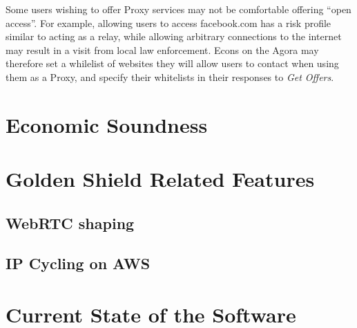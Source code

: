 \documentclass{article}
\begin{document}
Some users wishing to offer Proxy services may not be comfortable offering ``open access''. For example, allowing users to access facebook.com has a risk profile similar to acting as a relay, while allowing arbitrary connections to the internet may result in a visit from local law enforcement. Econs on the Agora may therefore set a whilelist of websites they will allow users to contact when using them as a Proxy, and specify their whitelists in their responses to \emph{Get Offers}.





\section{Economic Soundness}
\label{sec:economic-soundness}


\section{Golden Shield Related Features}
\label{sec:evasion}

\subsection{WebRTC shaping}

\subsection{IP Cycling on AWS}


\section{Current State of the Software}
\label{sec:current}
\end{document}
